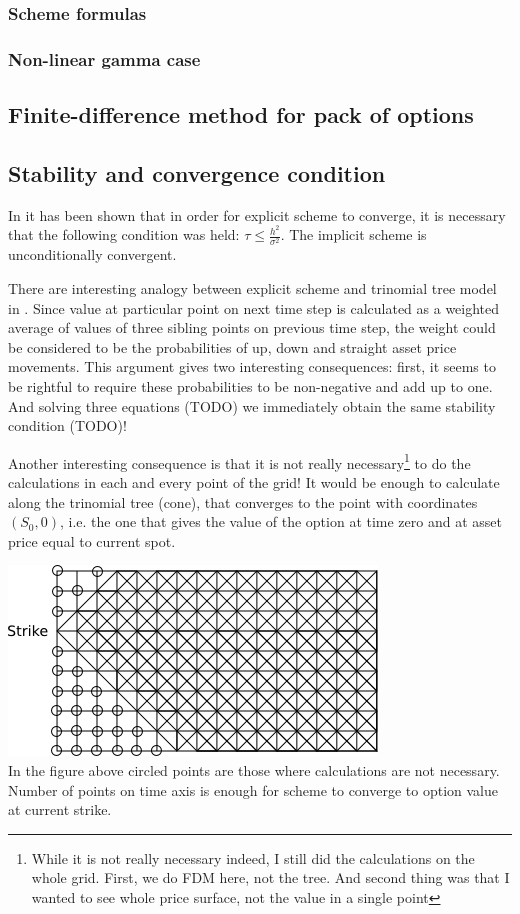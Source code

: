 \documentclass[11pt]{article} %
\begin{document}
\subsubsection{Scheme formulas}

\subsubsection{Non-linear gamma case}

\subsection{Finite-difference method for pack of options}

\subsection{Stability and convergence condition}
In \cite[ch. ????]{PWoQF06} it has been shown that in order for explicit scheme to converge, it is necessary that the following condition was held: $\tau \leq \frac{h^2}{\sigma^2}$. The implicit scheme is unconditionally convergent. 

There are interesting analogy between explicit scheme and trinomial tree model in \cite[ch. ???]{Hull03}. Since value at particular point on next time step is calculated as a weighted average of values of three sibling points on previous time step, the weight could be considered to be the probabilities of up, down and straight asset price movements. This argument gives two interesting consequences: first, it seems to be rightful to require these probabilities to be non-negative and add up to one. And solving three equations (TODO) we immediately obtain the same stability condition (TODO)! 

Another interesting consequence is that it is not really necessary\footnote{While it is not really necessary indeed, I still did the calculations on the whole grid. First, we do FDM here, not the tree. And second thing was that I wanted to see whole price surface, not the value in a single point} to do the calculations in each and every point of the grid! It would be enough to calculate along the trinomial tree (cone), that converges to the point with coordinates $(S_0, 0)$, i.e. the one that gives the value of the option at time zero and at asset price equal to current spot.

\includegraphics[scale=0.5]{convergent-tree.png}\\
In the figure above circled points are those where calculations are not necessary. Number of points on time axis is enough for scheme to converge to option value at current strike. 
\end{document}
